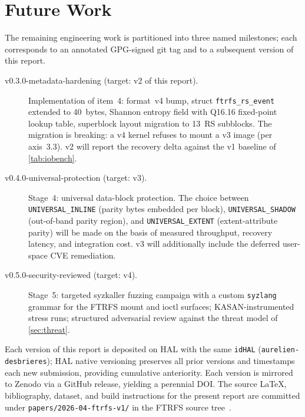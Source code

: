 \section{Future Work}\label{sec:future}

The remaining engineering work is partitioned into three named
milestones; each corresponds to an annotated GPG-signed git tag
and to a subsequent version of this report.

\begin{description}
\item[v0.3.0-metadata-hardening (target: v2 of this report).]
Implementation of item~4: format~v4 bump, struct
\texttt{ftrfs\_rs\_event} extended to 40~bytes, Shannon entropy
field with Q16.16 fixed-point lookup table, superblock layout
migration to 13~RS subblocks. The migration is breaking: a v4
kernel refuses to mount a v3 image (per axis~3.3). v2 will report
the recovery delta against the v1 baseline of \cref{tab:iobench}.

\item[v0.4.0-universal-protection (target: v3).]
Stage~4: universal data-block protection. The choice between
\texttt{UNIVERSAL\_INLINE} (parity bytes embedded per block),
\texttt{UNIVERSAL\_SHADOW} (out-of-band parity region), and
\texttt{UNIVERSAL\_EXTENT} (extent-attribute parity) will be made
on the basis of measured throughput, recovery latency, and
integration cost. v3 will additionally include the deferred
user-space CVE remediation.

\item[v0.5.0-security-reviewed (target: v4).]
Stage~5: targeted syzkaller fuzzing campaign with a custom
\texttt{syzlang} grammar for the FTRFS mount and ioctl surfaces;
KASAN-instrumented stress runs; structured adversarial review
against the threat model of \cref{sec:threat}.
\end{description}

Each version of this report is deposited on HAL with the same
\texttt{idHAL} (\texttt{aurelien-desbrieres}); HAL native
versioning preserves all prior versions and timestamps each new
submission, providing cumulative anteriority. Each version is
mirrored to Zenodo via a GitHub release, yielding a perennial DOI.
The source LaTeX, bibliography, dataset, and build instructions
for the present report are committed under
\texttt{papers/2026-04-ftrfs-v1/} in the FTRFS source
tree~\cite{ftrfs-repo}.
